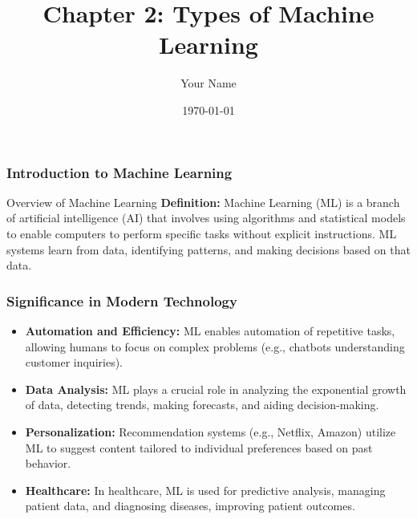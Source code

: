 \documentclass{beamer}
\title{Chapter 2: Types of Machine Learning}
\author{Your Name}
\institute{Your Institution}
\date{\today}
\begin{document}
\frame{\titlepage}

\begin{frame}[fragile]
    \frametitle{Introduction to Machine Learning}
    \begin{block}{Overview of Machine Learning}
        \textbf{Definition:}  
        Machine Learning (ML) is a branch of artificial intelligence (AI) that involves using algorithms and statistical models to enable computers to perform specific tasks without explicit instructions. ML systems learn from data, identifying patterns, and making decisions based on that data.
    \end{block}
\end{frame}

\begin{frame}[fragile]
    \frametitle{Significance in Modern Technology}
    \begin{itemize}
        \item \textbf{Automation and Efficiency:}  
        ML enables automation of repetitive tasks, allowing humans to focus on complex problems (e.g., chatbots understanding customer inquiries).
        
        \item \textbf{Data Analysis:}  
        ML plays a crucial role in analyzing the exponential growth of data, detecting trends, making forecasts, and aiding decision-making.
        
        \item \textbf{Personalization:}  
        Recommendation systems (e.g., Netflix, Amazon) utilize ML to suggest content tailored to individual preferences based on past behavior.
        
        \item \textbf{Healthcare:}  
        In healthcare, ML is used for predictive analysis, managing patient data, and diagnosing diseases, improving patient outcomes.
    \end{itemize}
\end{frame}
\end{document}
